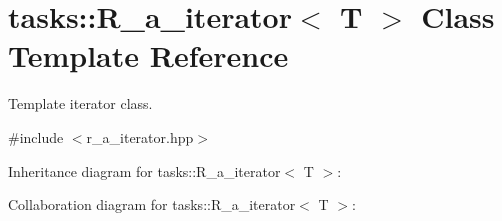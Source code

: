 \hypertarget{classtasks_1_1R__a__iterator}{}\section{tasks\+:\+:R\+\_\+a\+\_\+iterator$<$ T $>$ Class Template Reference}
\label{classtasks_1_1R__a__iterator}


Template iterator class.  




{\ttfamily \#include $<$r\+\_\+a\+\_\+iterator.\+hpp$>$}



Inheritance diagram for tasks\+:\+:R\+\_\+a\+\_\+iterator$<$ T $>$\+:


Collaboration diagram for tasks\+:\+:R\+\_\+a\+\_\+iterator$<$ T $>$\+:
